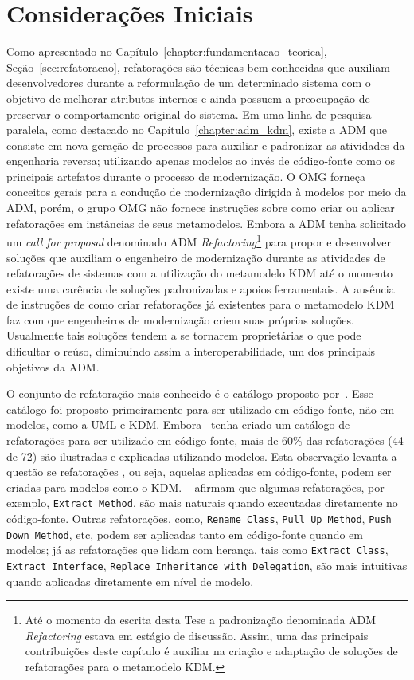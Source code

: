 \section{Considerações Iniciais}

Como apresentado no Capítulo~\ref{chapter:fundamentacao_teorica}, Seção~\ref{sec:refatoracao}, refatorações são técnicas bem conhecidas que auxiliam desenvolvedores durante a reformulação de um determinado sistema com o objetivo de melhorar atributos internos e ainda possuem a preocupação de preservar o comportamento original do sistema. Em uma linha de pesquisa paralela, como destacado no Capítulo~\ref{chapter:adm_kdm}, existe a ADM que consiste em nova geração de processos para auxiliar e padronizar as atividades da engenharia reversa; utilizando apenas modelos ao invés de código-fonte como os principais artefatos durante o processo de modernização. O OMG forneça conceitos gerais para a condução de modernização dirigida à modelos por meio da ADM, porém, o grupo OMG não fornece instruções sobre como criar ou aplicar refatorações em instâncias de seus metamodelos. Embora a ADM tenha solicitado um \textit{call for proposal} denominado ADM \textit{Refactoring}\footnote{Até o momento da escrita desta Tese a padronização denominada ADM \textit{Refactoring} estava em estágio de discussão. Assim, uma das principais contribuições deste capítulo é auxiliar na criação e adaptação de soluções de refatorações para o metamodelo KDM.} para propor e desenvolver soluções que auxiliam o engenheiro de modernização durante as atividades de refatorações de sistemas com a utilização do metamodelo KDM até o momento existe uma carência de soluções padronizadas e apoios ferramentais. A ausência de instruções de como criar refatorações já existentes para o metamodelo KDM faz com que engenheiros de modernização criem suas próprias soluções. Usualmente tais soluções tendem a se tornarem proprietárias o que pode dificultar o reúso, diminuindo assim a interoperabilidade, um dos principais objetivos da ADM.

O conjunto de refatoração mais conhecido é o catálogo proposto por~. Esse catálogo foi proposto primeiramente para ser utilizado em código-fonte, não em modelos, como a UML e KDM. Embora~ tenha criado um catálogo de refatorações para ser utilizado em código-fonte, mais de 60\% das refatorações (44 de 72) são ilustradas e explicadas utilizando modelos. Esta observação levanta a questão se refatorações , ou seja, aquelas aplicadas em código-fonte, podem ser criadas para modelos como o KDM. ~ afirmam que algumas refatorações, por exemplo, \texttt{Extract Method}, são mais naturais quando executadas diretamente no código-fonte. Outras refatorações, como, \texttt{Rename Class}, \texttt{Pull Up Method}, \texttt{Push Down Method}, etc, podem ser aplicadas tanto em código-fonte quando em modelos; já as refatorações que lidam com herança, tais como \texttt{Extract Class}, \texttt{Extract Interface}, \texttt{Replace Inheritance with Delegation}, são mais intuitivas quando aplicadas diretamente em nível de modelo. 

